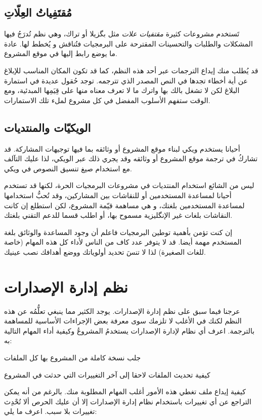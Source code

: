 \subsection{مُقتَفِياتُ العِلّاتِ}
تَستخدم مشروعات كثيرة {\it مقتفيات علات} مثل بگزيلا أو تراك، وهي نظم
تُدرَجُ فيها المشكلات والطلبات والتحسينات المقترحة على البرمجيات
فتُناقش و يُخطط لها. عادة ما يوضع رابط إليها في موقع المشروع.

قد يُطلب منك إيداع الترجمات عبر أحد هذه النظم، كما قد تكون المكان
المناسب للإبلاغ عن أية أخطاء تجدها في النص المصدر الذي تترجمه. توجد
حُقول عديدة في استمارة البلاغ لكن لا تشغل بالك بها واترك ما لا تعرف
معناه منها على قِيَمِها المبدئية، ومع الوقت ستفهم الأسلوب المفضل في كل
مشروع لملء تلك الاستمارات.

\subsection{الويكيّات والمنتديات}
أحيانا يستخدم ويكي لبناء موقع المشروع أو وثائقه بما فيها توجيهات
المشاركة. قد تشاركُ في ترجمة موقع المشروع أو وثائقه وقد يجري ذلك عبر
الويكي، لذا عليك التآلف مع استخدام صيغ تنسيق النصوص في ويكي.

ليس من الشائع استخدام المنتديات في مشروعات البرمجيات الحرة، لكنها قد
تستخدم أحيانا لمساعدة المستخدمين أو للنقاشات بين المشاركين، وقد تُحبُّ
استخدامها لمساعدة المستخدمين بلغتك، و هي مساهمة قيّمة المشروع، لكن
استطلع إن كانت النقاشات بلغات غير الإنگليزية مسموح بها، أو اطلب قسما
للدعم التقني بلغتك.

إن كنت تؤمن بأهمية توطين البرمجيات فاعلم أن وجود المساعدة والوثائق بلغة
المستخدم مهمة أيضا. قد لا يتوفر عدد كاف من الناس لأداء كل هذه المهام
(خاصة للغات الصغيرة) لذا لا تنسَ تحديد أولوياتك ووضع أهدافك نصب عينيك.

\section{نظم إدارة الإصدارات}
عرجنا فيما سبق على نظم إدارة
الإصدارات. يوجد الكثير مما ينبغي تعلُّمُه عن هذه النظم لكنك في الأغلب
لا تلزمك سوى معرفة بعض الإجراءات الأساسية للمساهمة بالترجمة. اعرف أي
نظام لإدارة الإصدارات يستخدمُ المشروعُ وكيفية أداء المهام التالية به:

\startitemize[1]
\item جلب نسخة كاملة من المشروع بها كل الملفات
\item كيفية تحديث الملفات لاحقا إلى آخر التغييرات التي حدثت في المشروع
\item كيفية إيداع ملف
\stopitemize
تغطي هذه الأمور أغلب المهام المطلوبة منك. بالرغم من أنه يمكن التراجع عن
أي تغييرات باستخدام نظام إدارة الإصدارات إلا أن عليك الحرص ألا تُحْدِث
تغييرات بلا سبب. اعرف ما يلي:


